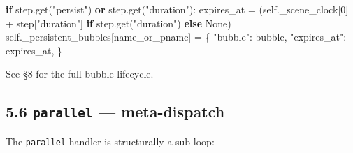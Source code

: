 \documentclass[
  11pt,
]{book}
\newenvironment{Shaded}{}{}
\newcommand{\ControlFlowTok}[1]{\textcolor[rgb]{0.00,0.44,0.13}{\textbf{#1}}}
\newcommand{\DecValTok}[1]{\textcolor[rgb]{0.25,0.63,0.44}{#1}}
\newcommand{\KeywordTok}[1]{\textcolor[rgb]{0.00,0.44,0.13}{\textbf{#1}}}
\newcommand{\NormalTok}[1]{#1}
\newcommand{\OperatorTok}[1]{\textcolor[rgb]{0.40,0.40,0.40}{#1}}
\newcommand{\StringTok}[1]{\textcolor[rgb]{0.25,0.44,0.63}{#1}}
\newcommand{\VariableTok}[1]{\textcolor[rgb]{0.10,0.09,0.49}{#1}}
\begin{document}
\begin{Shaded}
\begin{Highlighting}[]
\ControlFlowTok{if}\NormalTok{ step.get(}\StringTok{"persist"}\NormalTok{) }\KeywordTok{or}\NormalTok{ step.get(}\StringTok{"duration"}\NormalTok{):}
\NormalTok{    expires\_at }\OperatorTok{=}\NormalTok{ (}\VariableTok{self}\NormalTok{.\_scene\_clock[}\DecValTok{0}\NormalTok{] }\OperatorTok{+}\NormalTok{ step[}\StringTok{"duration"}\NormalTok{]}
                  \ControlFlowTok{if}\NormalTok{ step.get(}\StringTok{"duration"}\NormalTok{) }\ControlFlowTok{else} \VariableTok{None}\NormalTok{)}
    \VariableTok{self}\NormalTok{.\_persistent\_bubbles[name\_or\_pname] }\OperatorTok{=}\NormalTok{ \{}
        \StringTok{"bubble"}\NormalTok{: bubble,}
        \StringTok{"expires\_at"}\NormalTok{: expires\_at,}
\NormalTok{    \}}
\end{Highlighting}
\end{Shaded}

See §8 for the full bubble lifecycle.

\subsection{\texorpdfstring{5.6 \texttt{parallel} ---
meta-dispatch}{5.6 parallel --- meta-dispatch}}\label{parallel-meta-dispatch}

The \texttt{parallel} handler is structurally a sub-loop:
\end{document}
